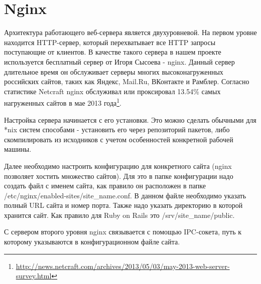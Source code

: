 \section{Nginx}
Архитектура работающего веб-сервера является двухуровневой. На первом уровне
находится HTTP-сервер, который перехватывает все HTTP запросы поступающие от
клиентов. В качестве такого сервера в нашем проекте используется бесплатный
сервер от Игоря Сысоева - nginx. Данный сервер длительное время он обслуживает
серверы многих высоконагруженных российских сайтов, таких как Яндекс, Mail.Ru,
ВКонтакте и Рамблер. Согласно статистике Netcraft nginx обслуживал или
проксировал 13.54\% самых нагруженных сайтов в мае 2013 года\footnote{
	\url{http://news.netcraft.com/archives/2013/05/03/may-2013-web-server-survey.html}
}.

Настройка сервера начинается с его установки. Это можно сделать обычными для
*nix систем способами - установить его через репозиторий пакетов, либо
скомпилировать из исходников с учетом особенностей конкретной рабочей машины.

Далее необходимо настроить конфигурацию для конкретного сайта (nginx позволяет
хостить множество сайтов). Для это в папке конфигурации надо создать файл с
именем сайта, как правило он расположен в папке
/etc/nginx/enabled-sites/site\_name.conf. В данном файле необходимо указать
полный URL сайта и номер порта. Также надо указать директорию в которой хранится
сайт. Как правило  для Ruby on Rails это /srv/site\_name/public.

С сервером второго уровня nginx связывается с помощью IPC-сокета, путь к 
которому указываются в конфигурационном файле сайта.